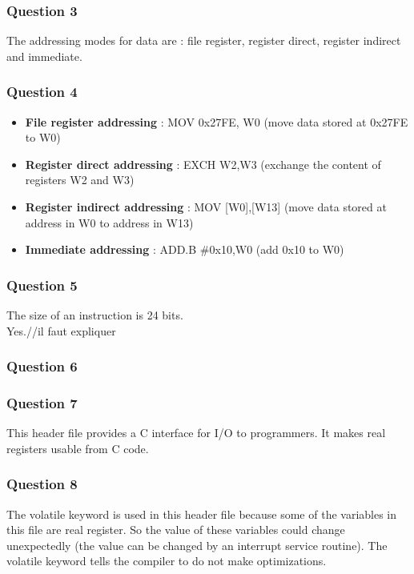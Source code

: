 \documentclass[a4paper,10pt]{article}
\begin{document}
\subsubsection*{Question 3}
The addressing modes for data are : file register, register direct, register indirect and immediate.

\subsubsection*{Question 4}
\begin{itemize}
\item \textbf{File register addressing} : MOV 0x27FE, W0 (move data stored at 0x27FE to W0)
\item \textbf{Register direct addressing} : EXCH W2,W3 (exchange the content of registers W2 and W3)
\item \textbf{Register indirect addressing} : MOV [W0],[W13] (move data stored at address in W0 to address in W13)
\item \textbf{Immediate addressing} : ADD.B $\#$0x10,W0 (add 0x10 to W0)
\end{itemize}

\subsubsection*{Question 5}
The size of an instruction is 24 bits.\\
Yes.//il faut expliquer

\subsubsection*{Question 6}

\subsubsection*{Question 7}
This header file provides a C interface for I/O to programmers. It makes real registers usable from C code.

\subsubsection*{Question 8}
The volatile keyword is used in this header file because some of the variables in this file are real register. So the value of these variables could change unexpectedly (the value can be changed by an interrupt service routine). The volatile keyword tells the compiler to do not make optimizations.
\end{document}

